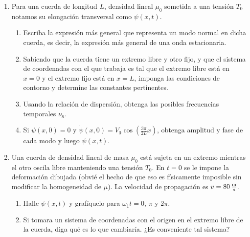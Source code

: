 \documentclass[11pt,spanish,a4paper]{article}
\begin{document}
\begin{enumerate}
\item Para una cuerda de longitud $L$, densidad lineal $\mu_{0}$ sometida a una tensión $T_0$ notamos su elongación transversal como $\psi(x,t)$.
\begin{enumerate}
	\item Escriba la expresión más general que representa un modo normal en
dicha cuerda, es decir, la expresión más general de una onda estacionaria.
	\item Sabiendo que la cuerda tiene un extremo libre y otro fijo, y que el
sistema de coordenadas con el que trabaja es tal que el extremo libre
está en $x=0$ y el extremo fijo está en $x=L$, imponga las condiciones
de contorno y determine las constantes pertinentes.
	\item Usando la relación de dispersión, obtenga las posibles frecuencias
temporales $\nu_{n}$. 
	\item Si $\psi(x,0)=0$ y $\dot{\psi}(x,0)=V_{0}\cos\left(\frac{3\pi}{2L}x\right)$, obtenga amplitud y fase de cada modo y luego $\psi(x,t)$.
\end{enumerate}



\item
\begin{minipage}[t][2.3cm]{0.6\textwidth}
Una cuerda de densidad lineal de masa $\mu_{0}$ está sujeta en un extremo mientras el otro oscila libre manteniendo una tensión $T_{0}$.
En $t = 0$ se le impone la deformación dibujada (obvié el hecho de que eso es físicamente imposible sin modificar la homogeneidad de $\mu$).
La velocidad de propagación es \(v = \SI{80}{\metre\over\second} \).
\end{minipage}
\begin{minipage}[c][0.4cm][t]{0.34\textwidth}
\end{minipage}
\begin{enumerate}
	\item Halle $\psi(x,t)$ y grafíquelo para $\omega_1 t = 0,\,\pi$ y $2\pi$.
	\item Si tomara un sistema de coordenadas con el origen en el extremo libre de la cuerda, diga qué es lo que cambiaría.
	¿Es conveniente tal sistema?
\end{enumerate}






\end{enumerate}
\end{document}
